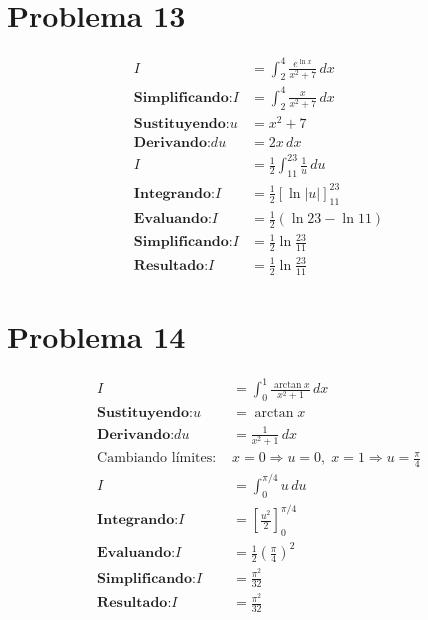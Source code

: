 \documentclass[12pt]{article}
\newcommand{\problema}[1]{\section*{Problema #1}}
\newcommand{\sustituyendo}{\textbf{Sustituyendo:} }
\newcommand{\derivando}{\textbf{Derivando:} }
\newcommand{\integrando}{\textbf{Integrando:} }
\newcommand{\evaluando}{\textbf{Evaluando:} }
\newcommand{\simplificando}{\textbf{Simplificando:} }
\newcommand{\obteniendo}{\textbf{Resultado:} }
\begin{document}
	\vspace{0.5cm}
	
	\problema{13}
	\begin{align*}
		I &= \int_{2}^{4} \frac{e^{\ln x}}{x^{2} + 7} \, dx \\
		\simplificando I &= \int_{2}^{4} \frac{x}{x^{2} + 7} \, dx \\
		\sustituyendo u &= x^{2} + 7 \\
		\derivando du &= 2x \, dx \\
		I &= \frac{1}{2} \int_{11}^{23} \frac{1}{u} \, du \\
		\integrando I &= \frac{1}{2} \left[ \ln|u| \right]_{11}^{23} \\
		\evaluando I &= \frac{1}{2} (\ln 23 - \ln 11) \\
		\simplificando I &= \frac{1}{2} \ln \frac{23}{11} \\
		\obteniendo I &= \boxed{\frac{1}{2} \ln \frac{23}{11}}
	\end{align*}
	
	\vspace{0.5cm}
	
	\problema{14}
	\begin{align*}
		I &= \int_{0}^{1} \frac{\arctan x}{x^2 + 1} \, dx \\
		\sustituyendo u &= \arctan x \\
		\derivando du &= \frac{1}{x^2 + 1} \, dx \\
		\text{Cambiando límites: } & x=0 \Rightarrow u=0,\; x=1 \Rightarrow u=\frac{\pi}{4} \\
		I &= \int_{0}^{\pi/4} u \, du \\
		\integrando I &= \left[ \frac{u^2}{2} \right]_{0}^{\pi/4} \\
		\evaluando I &= \frac{1}{2} \left( \frac{\pi}{4} \right)^2 \\
		\simplificando I &= \frac{\pi^2}{32} \\
		\obteniendo I &= \boxed{\frac{\pi^2}{32}}
	\end{align*}
	
	\vspace{0.5cm}
	
\end{document}
